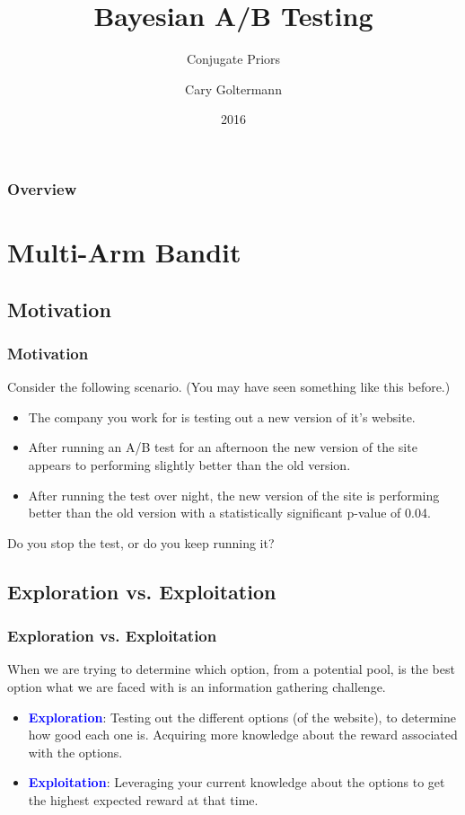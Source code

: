\documentclass{beamer}
\title{Bayesian A/B Testing}
\subtitle{Conjugate Priors}
\author{Cary Goltermann}
\institute{Galvanize}
\date{2016}
\begin{document}
\frame{\titlepage}

\begin{frame}
  \frametitle{Overview}
  \tableofcontents[]
\end{frame}

\section{Multi-Arm Bandit}
\subsection{Motivation}
\begin{frame}
  \frametitle{Motivation}
  Consider the following scenario. (You may have seen something like this before.) \vspace{2mm}
  \begin{itemize}
    \item The company you work for is testing out a new version of it's website. \pause
    \item After running an A/B test for an afternoon the new version of the site appears to performing slightly better than the old version. \pause
    \item After running the test over night, the new version of the site is performing better than the old version with a statistically significant p-value of 0.04. \pause
  \end{itemize} \vspace{3mm}

  Do you stop the test, or do you keep running it?
\end{frame}

\subsection{Exploration vs. Exploitation}
\begin{frame}
  \frametitle{Exploration vs. Exploitation}
  When we are trying to determine which option, from a potential pool, is the best option what we are faced with is an information gathering challenge. \vspace{2mm} \pause
  \begin{itemize}
    \item \textbf{\textcolor{blue}{Exploration}}: Testing out the different options (of the website), to determine how good each one is. Acquiring more knowledge about the reward associated with the options. \pause
    \item \textbf{\textcolor{blue}{Exploitation}}: Leveraging your current knowledge about the options to get the highest expected reward at that time.
  \end{itemize}
\end{frame}
\end{document}
